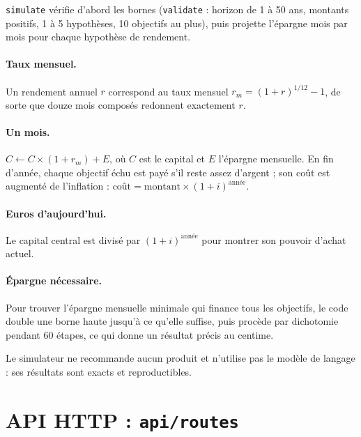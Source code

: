 \documentclass[11pt,a4paper]{article}
\begin{document}
{{\texttt{simulate} vérifie d'abord les bornes (\texttt{validate} : horizon de 1 à 50 ans, montants positifs, 1 à 5 hypothèses, 10 objectifs au plus), puis projette l'épargne mois par mois pour chaque hypothèse de rendement.

\paragraph{Taux mensuel.} Un rendement annuel \(r\) correspond au taux mensuel \(r_m = (1 + r)^{1/12} - 1\), de sorte que douze mois composés redonnent exactement \(r\).

\paragraph{Un mois.} \(C \leftarrow C \times (1 + r_m) + E\), où \(C\) est le capital et \(E\) l'épargne mensuelle. En fin d'année, chaque objectif échu est payé s'il reste assez d'argent ; son coût est augmenté de l'inflation : \(\text{coût} = \text{montant} \times (1 + i)^{\text{année}}\).


\paragraph{Euros d'aujourd'hui.} Le capital central est divisé par \((1+i)^{\text{année}}\) pour montrer son pouvoir d'achat actuel.

\paragraph{Épargne nécessaire.} Pour trouver l'épargne mensuelle minimale qui finance tous les objectifs, le code double une borne haute jusqu'à ce qu'elle suffise, puis procède par dichotomie pendant 60 étapes, ce qui donne un résultat précis au centime.


Le simulateur ne recommande aucun produit et n'utilise pas le modèle de langage : ses résultats sont exacts et reproductibles.

\section{API HTTP : \texttt{api/routes}}

}}
\end{document}
